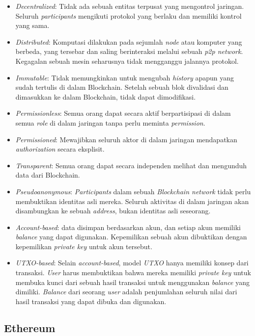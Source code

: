 \begin{itemize}
	\item \textit{Decentralized}: Tidak ada sebuah entitas terpusat yang mengontrol jaringan. Seluruh \textit{participants} mengikuti protokol yang berlaku dan memiliki kontrol yang sama.
	\item \textit{Distributed}: Komputasi dilakukan pada sejumlah \textit{node} atau komputer yang berbeda, yang tersebar dan saling berinteraksi melalui sebuah \textit{p2p network}. Kegagalan sebuah mesin seharusnya tidak mengganggu jalannya protokol.
	\item \textit{Immutable}: Tidak memungkinkan untuk mengubah \textit{history} apapun yang sudah tertulis di dalam Blockchain. Setelah sebuah blok divalidasi dan dimasukkan ke dalam Blockchain, tidak dapat dimodifikasi.
	\item \textit{Permissionless}: Semua orang dapat secara aktif berpartisipasi di dalam semua \textit{role} di dalam jaringan tanpa perlu meminta \textit{permission}.
	\item \textit{Permissioned}: Mewajibkan seluruh aktor di dalam jaringan mendapatkan \textit{authorization} secara eksplisit.
	\item \textit{Transparent}: Semua orang dapat secara independen melihat dan mengunduh data dari Blockchain.
	\item \textit{Pseudoanonymous}: \textit{Participants} dalam sebuah \textit{Blockchain network} tidak perlu membuktikan identitas asli mereka. Seluruh aktivitas di dalam jaringan akan disambungkan ke sebuah \textit{address}, bukan identitas asli seseorang.
	\item \textit{Account-based}: data disimpan berdasarkan akun, dan setiap akun memiliki \textit{balance} yang dapat digunakan. Kepemilikan sebuah akun dibuktikan dengan kepemilikan \textit{private key} untuk akun tersebut.
	\item \textit{UTXO-based}: Selain \textit{account-based}, model \textit{UTXO} hanya memiliki konsep dari transaksi. \textit{User} harus membuktikan bahwa mereka memiliki \textit{private key} untuk membuka kunci dari sebuah hasil transaksi untuk menggunakan \textit{balance} yang dimiliki. \textit{Balance} dari seorang \textit{user} adalah penjumlahan seluruh nilai dari hasil transaksi yang dapat dibuka dan digunakan.
\end{itemize}

\subsection{Ethereum}
\label{subsec:ethereum}

